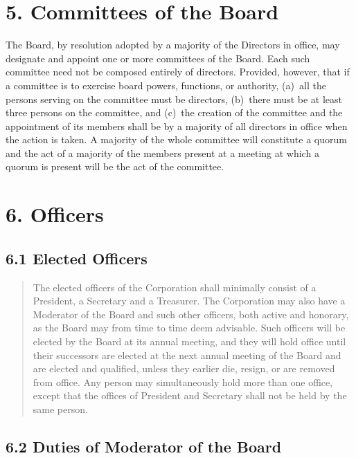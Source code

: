 \documentclass[
]{book}
\begin{document}
\section{5. Committees of the Board}\label{committees-of-the-board}

The Board, by resolution adopted by a majority of the Directors in
office, may designate and appoint one or more committees of the Board.
Each such committee need not be composed entirely of directors.
Provided, however, that if a committee is to exercise board powers,
functions, or authority, (a)~all the persons serving on the committee
must be directors, (b)~there must be at least three persons on the
committee, and (c)~the creation of the committee and the appointment of
its members shall be by a majority of all directors in office when the
action is taken. A majority of the whole committee will constitute a
quorum and the act of a majority of the members present at a meeting at
which a quorum is present will be the act of the committee.

\section{6. Officers}\label{officers}

\subsection{6.1 Elected Officers}\label{elected-officers}

\begin{quote}
The elected officers of the Corporation shall minimally consist of a
President, a Secretary and a Treasurer. The Corporation may also have
a Moderator of the Board and such other officers, both active and
honorary, as the Board may from time to time deem advisable. Such
officers will be elected by the Board at its annual meeting, and they
will hold office until their successors are elected at the next annual
meeting of the Board and are elected and qualified, unless they
earlier die, resign, or are removed from office. Any person may
simultaneously hold more than one office, except that the offices of
President and Secretary shall not be held by the same person.
\end{quote}

\subsection{6.2 Duties of Moderator of the Board}\label{duties-of-moderator-of-the-board}
\end{document}
